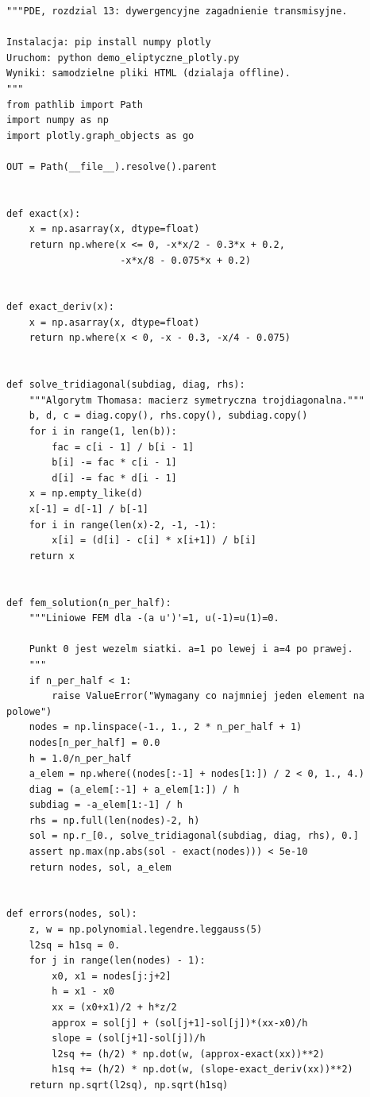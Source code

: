 \begin{lstlisting}[style=pythonpde,caption={Transmisja i zbieżność metody Galerkina (Plotly)},label={code:pde13-transmission}]
"""PDE, rozdzial 13: dywergencyjne zagadnienie transmisyjne.

Instalacja: pip install numpy plotly
Uruchom: python demo_eliptyczne_plotly.py
Wyniki: samodzielne pliki HTML (dzialaja offline).
"""
from pathlib import Path
import numpy as np
import plotly.graph_objects as go

OUT = Path(__file__).resolve().parent


def exact(x):
    x = np.asarray(x, dtype=float)
    return np.where(x <= 0, -x*x/2 - 0.3*x + 0.2,
                    -x*x/8 - 0.075*x + 0.2)


def exact_deriv(x):
    x = np.asarray(x, dtype=float)
    return np.where(x < 0, -x - 0.3, -x/4 - 0.075)


def solve_tridiagonal(subdiag, diag, rhs):
    """Algorytm Thomasa: macierz symetryczna trojdiagonalna."""
    b, d, c = diag.copy(), rhs.copy(), subdiag.copy()
    for i in range(1, len(b)):
        fac = c[i - 1] / b[i - 1]
        b[i] -= fac * c[i - 1]
        d[i] -= fac * d[i - 1]
    x = np.empty_like(d)
    x[-1] = d[-1] / b[-1]
    for i in range(len(x)-2, -1, -1):
        x[i] = (d[i] - c[i] * x[i+1]) / b[i]
    return x


def fem_solution(n_per_half):
    """Liniowe FEM dla -(a u')'=1, u(-1)=u(1)=0.

    Punkt 0 jest wezelm siatki. a=1 po lewej i a=4 po prawej.
    """
    if n_per_half < 1:
        raise ValueError("Wymagany co najmniej jeden element na polowe")
    nodes = np.linspace(-1., 1., 2 * n_per_half + 1)
    nodes[n_per_half] = 0.0
    h = 1.0/n_per_half
    a_elem = np.where((nodes[:-1] + nodes[1:]) / 2 < 0, 1., 4.)
    diag = (a_elem[:-1] + a_elem[1:]) / h
    subdiag = -a_elem[1:-1] / h
    rhs = np.full(len(nodes)-2, h)
    sol = np.r_[0., solve_tridiagonal(subdiag, diag, rhs), 0.]
    assert np.max(np.abs(sol - exact(nodes))) < 5e-10
    return nodes, sol, a_elem


def errors(nodes, sol):
    z, w = np.polynomial.legendre.leggauss(5)
    l2sq = h1sq = 0.
    for j in range(len(nodes) - 1):
        x0, x1 = nodes[j:j+2]
        h = x1 - x0
        xx = (x0+x1)/2 + h*z/2
        approx = sol[j] + (sol[j+1]-sol[j])*(xx-x0)/h
        slope = (sol[j+1]-sol[j])/h
        l2sq += (h/2) * np.dot(w, (approx-exact(xx))**2)
        h1sq += (h/2) * np.dot(w, (slope-exact_deriv(xx))**2)
    return np.sqrt(l2sq), np.sqrt(h1sq)



\end{lstlisting}
